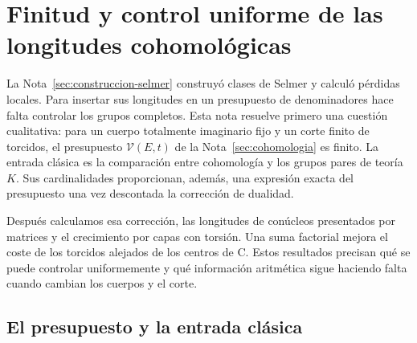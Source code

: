 \section{Finitud y control uniforme de las longitudes cohomológicas}
\label{sec:finitud-uniforme}

La Nota~\ref{sec:construccion-selmer} construyó clases de Selmer y
calculó pérdidas locales. Para insertar sus longitudes en un presupuesto
de denominadores hace falta controlar los grupos completos. Esta nota
resuelve primero una cuestión cualitativa: para un cuerpo totalmente
imaginario fijo y un corte finito de torcidos, el presupuesto
$\mathcal V(E,t)$ de la Nota~\ref{sec:cohomologia} es finito. La entrada
clásica es la comparación entre cohomología y los grupos pares de
teoría $K$. Sus cardinalidades proporcionan, además, una expresión
exacta del presupuesto una vez descontada la corrección de dualidad.

Después calculamos esa corrección, las longitudes de conúcleos
presentados por matrices y el crecimiento por capas con torsión.
Una suma factorial mejora el coste de los torcidos alejados de los
centros de C. Estos resultados precisan qué se puede controlar
uniformemente y qué información aritmética sigue haciendo falta
cuando cambian los cuerpos y el corte.


\subsection{El presupuesto y la entrada clásica}

